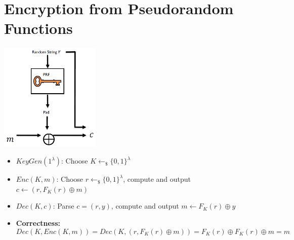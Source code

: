 \section{Encryption from Pseudorandom Functions}
	\begin{center}
		\includegraphics[width=48mm]{Graphics/CPA/cpa3.png}
	\end{center}
	\begin{itemize}
	    \item $KeyGen(1^{\lambda})$: Choose $K \leftarrow_{\$} \{0,1\}^{\lambda}$
	    \item $Enc(K,m)$: Choose $r \leftarrow_{\$} \{0,1\}^{\lambda}$, compute and output $c \leftarrow (r,F_K(r) \oplus m)$
	    \item $Dec(K,c)$: Parse $c=(r,y)$, compute and output $m \leftarrow F_K(r) \oplus y$
	    \item \textbf{Correctness:}
	    $$Dec(K,Enc(K,m))=Dec(K,(r,F_K(r) \oplus m))=F_K(r) \oplus F_K(r) \oplus m = m$$
	\end{itemize}
	

